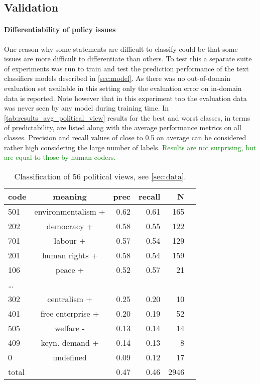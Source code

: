 \documentclass[11pt]{article}
\newcommand{\felix}[1]{\textcolor{green}{#1}}
\begin{document}
\subsection{Validation}
\paragraph{Differentiability of policy issues}
One reason why some statements are difficult to classify could be that some issues are more difficult to differentiate than others. To test this a separate suite of experiments was run to train and test the prediction performance of the text classifiers models described in \autoref{sec:model}. As there was no out-of-domain evaluation set available in this setting only the evaluation error on in-domain data is reported. Note however that in this experiment too the evaluation data was never seen by any model during training time.
In \autoref{tab:results_avg_political_view} results for the best and worst classes, in terms of predictability, are listed along with the average performance metrics on all classes.
Precision and recall values of close to 0.5 on average can be considered rather high considering the large number of labels. \felix{Results are not surprising, but are equal to those by human coders.} \\

\begin{table}
\caption{
\label{tab:results_avg_political_view}
Classification of 56 political views, see \autoref{sec:data}.
}
\begin{center}
\footnotesize
\begin{tabular}{lcrrrr}
code & meaning  &      prec    &recall & N\\
\hline\hline
%
       501  & environmentalism + &      0.62   &   0.61 &      165\\
        202 &   democracy + &   0.58  &    0.55   &      122\\
        701    & labour +&  0.57  &    0.54   &   129\\
                201    &human rights +  & 0.58   &   0.54   &      159\\
         106   & peace + & 0.52&      0.57   &       21\\
\dots\\
        302     &centralism + & 0.25     & 0.20  &          10\\
        401    &  free enterprise + &0.20    &  0.19    &       52\\
        505    &welfare - &  0.13   &   0.14   &      14\\
        409    & keyn. demand +&  0.14  &      0.13   &      8\\
            0    & undefined &  0.09  &    0.12   &    17\\
            \hline
 total  &  &  0.47    &  0.46 &    2946\\
%
\end{tabular}
\end{center}
\end{table}
\end{document}
